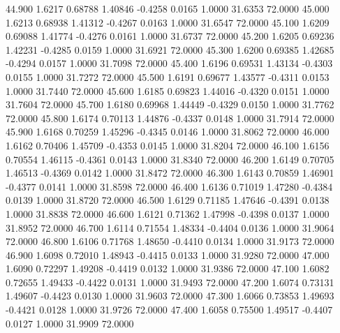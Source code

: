   44.900   1.6217   0.68788   1.40846  -0.4258   0.0165   1.0000  31.6353  72.0000
  45.000   1.6213   0.68938   1.41312  -0.4267   0.0163   1.0000  31.6547  72.0000
  45.100   1.6209   0.69088   1.41774  -0.4276   0.0161   1.0000  31.6737  72.0000
  45.200   1.6205   0.69236   1.42231  -0.4285   0.0159   1.0000  31.6921  72.0000
  45.300   1.6200   0.69385   1.42685  -0.4294   0.0157   1.0000  31.7098  72.0000
  45.400   1.6196   0.69531   1.43134  -0.4303   0.0155   1.0000  31.7272  72.0000
  45.500   1.6191   0.69677   1.43577  -0.4311   0.0153   1.0000  31.7440  72.0000
  45.600   1.6185   0.69823   1.44016  -0.4320   0.0151   1.0000  31.7604  72.0000
  45.700   1.6180   0.69968   1.44449  -0.4329   0.0150   1.0000  31.7762  72.0000
  45.800   1.6174   0.70113   1.44876  -0.4337   0.0148   1.0000  31.7914  72.0000
  45.900   1.6168   0.70259   1.45296  -0.4345   0.0146   1.0000  31.8062  72.0000
  46.000   1.6162   0.70406   1.45709  -0.4353   0.0145   1.0000  31.8204  72.0000
  46.100   1.6156   0.70554   1.46115  -0.4361   0.0143   1.0000  31.8340  72.0000
  46.200   1.6149   0.70705   1.46513  -0.4369   0.0142   1.0000  31.8472  72.0000
  46.300   1.6143   0.70859   1.46901  -0.4377   0.0141   1.0000  31.8598  72.0000
  46.400   1.6136   0.71019   1.47280  -0.4384   0.0139   1.0000  31.8720  72.0000
  46.500   1.6129   0.71185   1.47646  -0.4391   0.0138   1.0000  31.8838  72.0000
  46.600   1.6121   0.71362   1.47998  -0.4398   0.0137   1.0000  31.8952  72.0000
  46.700   1.6114   0.71554   1.48334  -0.4404   0.0136   1.0000  31.9064  72.0000
  46.800   1.6106   0.71768   1.48650  -0.4410   0.0134   1.0000  31.9173  72.0000
  46.900   1.6098   0.72010   1.48943  -0.4415   0.0133   1.0000  31.9280  72.0000
  47.000   1.6090   0.72297   1.49208  -0.4419   0.0132   1.0000  31.9386  72.0000
  47.100   1.6082   0.72655   1.49433  -0.4422   0.0131   1.0000  31.9493  72.0000
  47.200   1.6074   0.73131   1.49607  -0.4423   0.0130   1.0000  31.9603  72.0000
  47.300   1.6066   0.73853   1.49693  -0.4421   0.0128   1.0000  31.9726  72.0000
  47.400   1.6058   0.75500   1.49517  -0.4407   0.0127   1.0000  31.9909  72.0000
